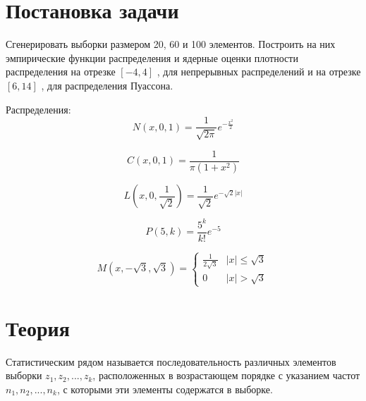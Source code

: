 \documentclass[a4]{article}
\renewcommand{\listoffigures}{\begingroup %
\tocsection
\tocfile{\listfigurename}{lof}
\endgroup}
\renewcommand{\listoftables}{\begingroup %
\tocsection
\tocfile{\listtablename}{lot}
\endgroup}
\begin{document}


\newpage
\tableofcontents{}
\newpage
\listoffigures{}
\listoftables{}
\newpage

\section{Постановка задачи}

Сгенерировать выборки размером 20, 60 и 100 элементов.
Построить на них эмпирические функции распределения и ядерные
оценки плотности распределения на отрезке $[-4, 4]$ , для непрерывных
распределений и на отрезке $[6, 14]$ , для распределения Пуассона.


Распределения:
\begin{equation}\label{eqn:normal}
N(x,0,1) = \frac{1}{\sqrt{2\pi}}e^{-\frac{x^2}{2}}
\end{equation} 

\begin{equation}\label{eqn:cauchy}
C(x,0,1) = \frac{1}{\pi(1+x^2)}
\end{equation}

\begin{equation}\label{eqn:laplace}
L\left( x,0,\frac{1}{\sqrt{2}}\right) = \frac{1}{\sqrt{2}}e^{-\sqrt{2}\vert x\vert}
\end{equation}

\begin{equation}\label{eqn:poisson}
P(5,k) = \frac{5^k}{k!}e^{-5}
\end{equation}  

\begin{equation}\label{eqn:uniform}
M(x,-\sqrt{3}, \sqrt{3}) = 
\begin{cases}
\frac{1}{2\sqrt{3}} &\vert x\vert \leqslant \sqrt{3}\\
0 &\vert x\vert > \sqrt{3}
\end{cases}
\end{equation}


\section{Теория}

Статистическим рядом называется последовательность различных элементов выборки $z_{1}, z_{2}, ... , z_{k}$, расположенных в возрастающем порядке с указанием частот $n_{1}, n_{2}, ... , n_{k}$, с которыми эти элементы содержатся в выборке.
\end{document}
